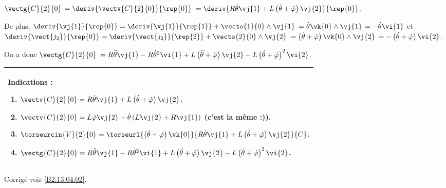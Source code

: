 \ifprof~\\

$\vectg{C}{2}{0}$ $ = \deriv{\vectv{C}{2}{0}}{\rep{0}}$ $= \deriv{R\dot{\theta}\vj{1}+L\left( \dot{\theta}+\dot{\varphi}\right)\vj{2}}{\rep{0}}$.

De plus,  $\deriv{\vj{1}}{\rep{0}} = \deriv{\vj{1}}{\rep{1}} + \vecto{1}{0}\wedge \vj{1}$
$ =\dot{\theta}\vk{0} \wedge \vj{1} $ $=-\dot{\theta}\vi{1}$ et 
$\deriv{\vect{j_2}}{\rep{0}} = \deriv{\vect{j_2}}{\rep{2}} + \vecto{2}{0}\wedge \vj{2}$
$ = \left( \dot{\theta}+\dot{\varphi}\right)\vk{0}\wedge \vj{2}$ $ = -\left( \dot{\theta}+\dot{\varphi}\right)\vi{2}$.

On a donc $\vectg{C}{2}{0}$ $=R\ddot{\theta}\vj{1}-R\dot{\theta}^2\vi{1}+L\left( \ddot{\theta}+\ddot{\varphi}\right)\vj{2}-L\left( \dot{\theta}+\dot{\varphi}\right)^2\vi{2}$.

\else
\fi

\ifprof
\else
\ifcolle
\else
\footnotesize
\begin{center}
\begin{tabular}{|p{.9\linewidth}|}
\hline
Indications :
\begin{enumerate}
\item $ \vectv{C}{2}{0}= R\dot{\theta}\vj{1}+L\left( \dot{\theta}+\dot{\varphi}\right)\vj{2}$.
\item $\vectv{C}{2}{0} = L\dot{\varphi}\vj{2} + \dot{\theta}\left( L\vj{2} +R\vj{1}\right)$ (c'est la même :)).
\item $\torseurcin{V}{2}{0}=\torseurl{ \left( \dot{\theta}+\dot{\varphi}\right)\vk{0}}{R\dot{\theta}\vj{1}+L\left( \dot{\theta}+\dot{\varphi}\right)\vj{2}}{C}$.
\item $\vectg{C}{2}{0}=R\ddot{\theta}\vj{1}-R\dot{\theta}^2\vi{1}+L\left( \ddot{\theta}+\ddot{\varphi}\right)\vj{2}-L\left( \dot{\theta}+\dot{\varphi}\right)^2\vi{2}$.
\end{enumerate} \\ \hline
\end{tabular}
\end{center}
\normalsize
\fi

\begin{flushright}
\footnotesize{Corrigé  voir \ref{B2:13:04:02}.}
\end{flushright}%
\fi